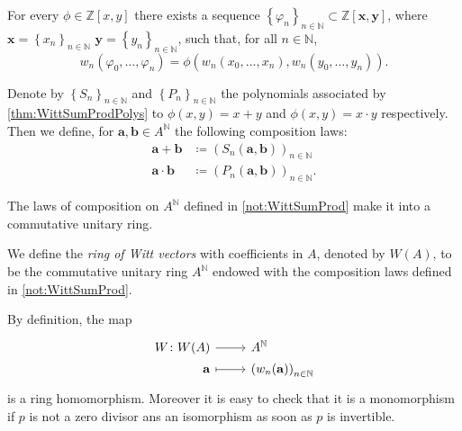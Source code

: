 \begin{lem}\label{thm:WittSumProdPolys}
	For every $\phi \in \mathbb{Z}[x,y]$ there exists a sequence
	$\left\{ \varphi_n \right\}_{n \in \mathbb{N}} \subset \mathbb{Z}[\mathbf{x}, \mathbf{y}]$,
	where $\mathbf{x} = \left\{ x_n \right\}_{n \in \mathbb{N}}$
	$\mathbf{y} = \left\{ y_n \right\}_{n \in \mathbb{N}}$, such that,
	for all $n \in \mathbb{N}$,
	\begin{equation*}
		w_n(\varphi_0, \ldots, \varphi_n) =
		\phi \left( w_n(x_0, \ldots, x_n), w_n(y_0, \ldots, y_n) \right)
	.\end{equation*}
\end{lem} 


\begin{ntt}[]\label{not:WittSumProd}
	Denote by $\left\{ S_n \right\}_{n \in \mathbb{N}}$ and
	$\left\{ P_n \right\}_{n \in \mathbb{N}}$ the polynomials associated 
	by \cref{thm:WittSumProdPolys} to 
	$\phi(x,y) = x + y$ and $\phi(x,y) = x \cdot y$ respectively.
	Then we define, for $\mathbf{a},\mathbf{b} \in A^{\mathbb{N}}$ the following
	composition laws:
	\begin{align*}
		\mathbf{a} + \mathbf{b} &\coloneqq
		\left( S_n(\mathbf{a},\mathbf{b}) \right)_{n \in \mathbb{N}}\\
		\mathbf{a} \cdot \mathbf{b} &\coloneqq 
		\left( P_n(\mathbf{a},\mathbf{b}) \right)_{n \in \mathbb{N}}
	.\end{align*}
\end{ntt}


\begin{thm}
	The laws of composition on $A^{\mathbb{N}}$ defined in \cref{not:WittSumProd}
	make it into a commutative unitary ring.
\end{thm}


\begin{defn}
	We define the {\em ring of Witt vectors} with coefficients in $A$,
	denoted by $W(A)$, to be the commutative unitary ring $A^{\mathbb{N}}$
	endowed with the composition laws defined in \cref{not:WittSumProd}.
\end{defn}


\begin{rem}[]
	By definition, the map
	\begin{equation*}
	\begin{tikzcd}[row sep = 0ex
		,/tikz/column 1/.append style={anchor=base east}
		,/tikz/column 2/.append style={anchor=base west}]
		W\colon W(A) \arrow[r, "", rightarrow] &
		A^{\mathbb{N}} \\
		\mathbf{a} \arrow[r, "", mapsto] & 
		\left( w_n(\mathbf{a}) \right)_{n \in \mathbb{N}}
	\end{tikzcd}
	\end{equation*} 
	is a ring homomorphism.
	Moreover it is easy to check that it is 
	a monomorphism if $p$ is not a zero divisor ans
	an isomorphism as soon as $p$ is invertible. 
\end{rem}


